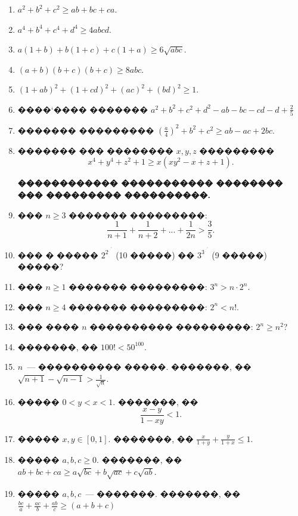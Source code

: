 \documentclass[a4paper,12pt]{article}
\begin{document}
\medskip\medskip\medskip

\begin{enumerate}
 \item $a^{2}+b^{2}+c^{2}\geq ab+bc+ca$.

\item $a^{4}+b^{4}+c^{4}+d^{4}\geq 4abcd$.

\item $a(1+b)+b(1+c)+c(1+a)\geq 6\sqrt{abc}$.

\item $(a+b)(b+c)(b+c)\geq 8abc$.

\item $(1+ab)^{2}+(1+cd)^{2}+(ac)^{2}+(bd)^{2}\geq 1$.

\item ����`���� ������� $a^{2}+b^{2}+c^{2}+d^{2}-ab-bc-cd-d+\frac{2}{5}$

\item ������� ��������� $(\frac{a}{4})^{2}+b^{2}+c^{2}\geq ab-ac+2bc$.

\item ������� ��� �������� $x,y,z$ ��������� $$x^{4}+y^{4}+z^{2}+1\geq x(xy^{2}-x+z+1).$$

\textbf{������������ ����������� �������� ��� ��������� ����������.}

\item ��� $n\geq3$ ������� ���������: $$\frac{1}{n+1}+\frac{1}{n+2}+...+\frac{1}{2n}>\frac{3}{5}.$$

\item ��� � ����� $2^{2^{.^{.^{.^{2}}}}}$ (10 �����) �� $3^{3^{.^{.^{.^{3}}}}}$ (9 �����) �����?

\item ��� $n\geq1$ ������� ���������: $3^{n}>n\cdot 2^{n}$.

\item ��� $n\geq4$ ������� ���������: $2^{n}<n!$.

\item ��� ���� $n$ ���������� ���������: $2^{n}\geq n^{2}$?

\item �������, �� $100!<50^{100}$.

\item $n$~--- ���������� �����. �������, �� $\sqrt{n+1}-\sqrt{n-1}>\frac{1}{\sqrt{n}}$.

\item ����� $0<y<x<1$. �������, �� $$\frac{x-y}{1-xy}<1.$$

\item ����� $x,y\in [0,1]$. �������, �� $\frac{x}{1+y}+\frac{y}{1+x}\leq 1$.

\item ����� $a,b,c\geq0$. �������, �� $ab+bc+ca\geq a\sqrt{bc}+b\sqrt{ac}+c\sqrt{ab}$.

\item ����� $a,b,c$~--- �������. �������, �� $\frac{bc}{a}+\frac{ac}{b}+\frac{ab}{c}\geq (a+b+c)$


\end{enumerate}
\end{document}
